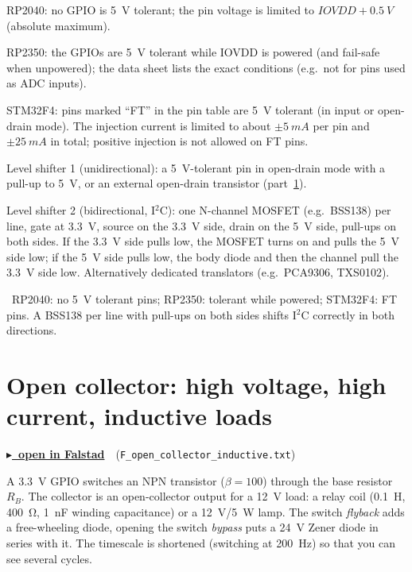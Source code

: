 \documentclass[a4paper,11pt]{article}
\newenvironment{solution}{\begin{solbox}}{\end{solbox}}
\newcommand{\answer}{\par\smallskip{\sffamily\bfseries\color{rwuviolet}Answer:}\ }
\newcommand{\circuitlink}[2]{\href{#1}{\color{rwucyandark}\sffamily\bfseries $\blacktriangleright$\ open in Falstad}\ \ (\texttt{#2})}
\begin{document}
\begin{solution}
\begin{steps}
  \item RP2040: no GPIO is \SI{5}{V} tolerant; the pin voltage is limited to $IOVDD+\SI{0.5}{V}$ (absolute
        maximum).
  \item RP2350: the GPIOs are \SI{5}{V} tolerant while IOVDD is powered (and fail-safe when unpowered); the data
        sheet lists the exact conditions (e.g.\ not for pins used as ADC inputs).
  \item STM32F4: pins marked ``FT'' in the pin table are \SI{5}{V} tolerant (in input or open-drain mode). The
        injection current is limited to about $\pm\SI{5}{mA}$ per pin and $\pm\SI{25}{mA}$ in total; positive
        injection is not allowed on FT pins.
  \item Level shifter 1 (unidirectional): a \SI{5}{V}-tolerant pin in open-drain mode with a pull-up to
        \SI{5}{V}, or an external open-drain transistor (part~\ref{sec:oc}).
  \item Level shifter 2 (bidirectional, I$^2$C): one N-channel MOSFET (e.g.\ BSS138) per line, gate at
        \SI{3.3}{V}, source on the \SI{3.3}{V} side, drain on the \SI{5}{V} side, pull-ups on both sides. If the
        \SI{3.3}{V} side pulls low, the MOSFET turns on and pulls the \SI{5}{V} side low; if the \SI{5}{V} side
        pulls low, the body diode and then the channel pull the \SI{3.3}{V} side low. Alternatively dedicated
        translators (e.g.\ PCA9306, TXS0102).
\end{steps}
\answer RP2040: no \SI{5}{V} tolerant pins; RP2350: tolerant while powered; STM32F4: FT pins. A BSS138 per line
with pull-ups on both sides shifts I$^2$C correctly in both directions.
\end{solution}

\needspace{0.45\textheight}
\section{Open collector: high voltage, high current, inductive loads}\label{sec:oc}
\circuitlink{\linkF}{F\_open\_collector\_inductive.txt}

A \SI{3.3}{V} GPIO switches an NPN transistor ($\beta=100$) through the base resistor $R_B$. The collector is an
open-collector output for a \SI{12}{V} load: a relay coil (\SI{0.1}{H}, \SI{400}{\ohm}, \SI{1}{nF} winding
capacitance) or a \SI{12}{V}/\SI{5}{W} lamp. The switch \emph{flyback} adds a free-wheeling diode, opening the
switch \emph{bypass} puts a \SI{24}{V} Zener diode in series with it. The timescale is shortened (switching at
\SI{200}{Hz}) so that you can see several cycles.
\end{document}
